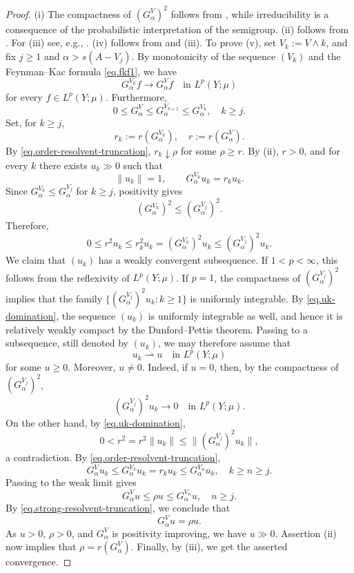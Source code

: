 \documentclass[11pt,a4paper,reqno]{amsart}
\theoremstyle{definition}
\numberwithin{equation}{section}
\begin{document}
\begin{proof}
(i) The compactness of   $(G^V_\alpha)^2$  follows from \cite[Corollary 3.7.15]{MeyerNieberg1991}, 
while irreducibility is a consequence of the 
probabilistic interpretation of the semigroup. (ii) follows from \cite[Theorem~V.5.2(iv) and the Corollary on p.~329]{Schaefer1974}. 
For (iii) see, e.g., \cite[(1.8) in Chapter VI]{EngelNagel2000}. (iv) follows from \cite[Theorem 2.1]{AD} and (iii).
To prove (v), set $V_k:=V\wedge k$, and fix $j\geq1$ and  $\alpha>s(A-V_j)$.
By monotonicity of the sequence $(V_k)$
and 
the  Feynman--Kac formula \eqref{eq.fkf1}, we have
\begin{equation}\label{eq.strong-resolvent-truncation}
G_\alpha^{V_k}f\longrightarrow G_\alpha^Vf
\quad\text{in }L^p(Y;\mu)
\end{equation}
for every $f\in L^p(Y;\mu)$. Furthermore,
\begin{equation}\label{eq.order-resolvent-truncation}
0\leq G_\alpha^V
\leq G_\alpha^{V_{k+1}}
\leq G_\alpha^{V_k},\quad k\ge j.
\end{equation}
Set, for $k\ge j$,
\[
r_k:=r(G_\alpha^{V_k}),
\quad
r:=r(G_\alpha^V).
\]
By \eqref{eq.order-resolvent-truncation}, $r_k\downarrow\rho$
for some $\rho\geq r$. By (ii), $r>0$, and for every $k$ there
exists $u_k\gg0$ such that
\[
\|u_k\|=1,
\qquad
G_\alpha^{V_k} u_k=r_ku_k.
\]
Since $G_\alpha^{V_k}\leq G_\alpha^{V_j}$ for $k\ge j$, positivity gives
\[
(G_\alpha^{V_k})^2\leq (G_\alpha^{V_j})^2.
\]
Therefore,
\begin{equation}\label{eq.uk-domination}
0\leq r^2u_k
\leq r_k^2u_k
=
(G_\alpha^{V_k})^2u_k
\leq (G_\alpha^{V_j})^2u_k.
\end{equation}
We claim that $(u_k)$ has a weakly convergent subsequence. If
$1<p<\infty$, this follows from the reflexivity of $L^p(Y;\mu)$.
If $p=1$, the compactness of $(G_\alpha^{V_j})^2$ implies that the family
$\{(G_\alpha^{V_j})^2u_k:k\geq1\}$
is uniformly integrable. By \eqref{eq.uk-domination}, the sequence
$(u_k)$ is uniformly integrable as well, and hence it is relatively
weakly compact by the Dunford--Pettis theorem.
Passing to a subsequence, still denoted by $(u_k)$, we may therefore
assume that
\[
u_k\rightharpoonup u \quad\text{in }L^p(Y;\mu)
\]
for some $u\geq0$. Moreover, $u\neq0$. Indeed, if $u=0$, then,
by the compactness of $(G_\alpha^{V_j})^2$,
\[
(G_\alpha^{V_j})^2u_k\longrightarrow0\quad\text{in }L^p(Y;\mu).
\]
On the other hand,  by  \eqref{eq.uk-domination}, 
\[
0<r^2=r^2\|u_k\|\leq \|(G_\alpha^{V_j})^2u_k\|,
\]
a contradiction.
By \eqref{eq.order-resolvent-truncation}, 
\[
G_\alpha^{V}u_k\leq G_\alpha^{V_k}u_k=r_ku_k\leq G_\alpha^{V_n}u_k,\quad k\ge n\ge j.
\]
Passing to the weak limit gives
\[
G_\alpha^{V} u\leq\rho u\leq G_\alpha^{V_n}u,\quad n\ge j.
\]
By \eqref{eq.strong-resolvent-truncation}, we conclude that
\[
G_\alpha^{V} u=\rho u.
\]
As $u>0$, $\rho>0$, and $G_\alpha^{V}$ is positivity improving, we have $u\gg0$.
Assertion (ii) now implies that $\rho=r(G_\alpha^{V})$.
Finally, by (iii), we get the asserted convergence.
\end{proof}
\end{document}
